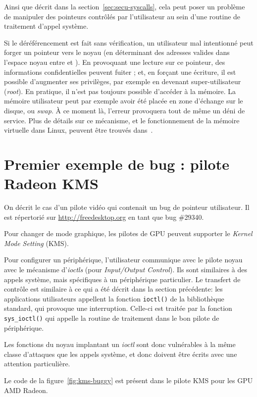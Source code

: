 Ainsi que décrit dans la section~\ref{sec:secu-syscalls}, cela peut poser un
problème de manipuler des pointeurs contrôlés par l'utilisateur au sein d'une
routine de traitement d'appel système.

Si le déréférencement est fait sans vérification, un utilisateur mal intentionné
peut forger un pointeur vers le noyau (en déterminant des adresses valides dans
l'espace noyau entre  et ). En provoquant
une lecture sur ce pointeur, des informations confidentielles peuvent fuiter ;
et, en forçant une écriture, il est possible d'augmenter ses privilèges, par
exemple en devenant super-utilisateur (\emph{root}). En pratique, il n'est pas
toujours possible d'accéder à la mémoire. La mémoire utilisateur peut par
exemple avoir été placée en zone d'échange sur le disque, ou \emph{swap}. À ce
moment là, l'erreur provoquera tout de même un déni de service. Plus de détails
sur ce mécanisme, et le fonctionnement de la mémoire virtuelle dans Linux,
peuvent être trouvés dans~\cite{userspaceaccess}.

\section{Premier exemple de bug : pilote Radeon KMS}

On décrit le cas d'un pilote vidéo qui contenait un bug de pointeur utilisateur.
Il est répertorié sur \url{http://freedesktop.org} en tant que bug \#29340.

Pour changer de mode graphique, les pilotes de GPU peuvent supporter le
\emph{Kernel Mode Setting} (KMS).

Pour configurer un périphérique, l'utilisateur communique avec le pilote noyau
avec le mécanisme d'\emph{ioctls} (pour \emph{Input/Output Control}).
Ils sont similaires à des appels système, mais spécifiques à un périphérique
particulier. Le transfert de contrôle est similaire à ce qui a été décrit dans
la section précédente: les applications utilisateurs appellent la fonction
\texttt{ioctl()} de la bibliothèque standard, qui provoque une interruption.
Celle-ci est traitée par la fonction \texttt{sys\_ioctl()} qui appelle la
routine de traitement dans le bon pilote de périphérique.

Les fonctions du noyau implantant un \emph{ioctl} sont donc vulnérables à la
même classe d'attaques que les appels système, et donc doivent être écrits avec
une attention particulière.

Le code de la figure~\ref{fig:kms-buggy} est présent dans le pilote KMS pour les
GPU AMD Radeon.


